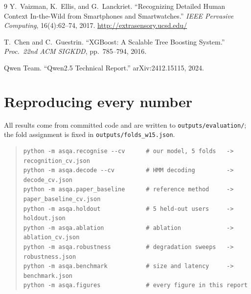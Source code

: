 \documentclass[11pt,a4paper]{article}
\newcommand{\code}[1]{\texttt{\small #1}}
\begin{document}
\begin{thebibliography}{9}
\small
{}
Y.~Vaizman, K.~Ellis, and G.~Lanckriet.
``Recognizing Detailed Human Context In-the-Wild from Smartphones and Smartwatches.''
\emph{IEEE Pervasive Computing}, 16(4):62--74, 2017.
\url{http://extrasensory.ucsd.edu/}

T.~Chen and C.~Guestrin.
``XGBoost: A Scalable Tree Boosting System.''
\emph{Proc.\ 22nd ACM SIGKDD}, pp.~785--794, 2016.

Qwen Team. ``Qwen2.5 Technical Report.'' arXiv:2412.15115, 2024.
\end{thebibliography}

\appendix
\section{Reproducing every number}

All results come from committed code and are written to \code{outputs/evaluation/}; the
fold assignment is fixed in \code{outputs/folds\_w15.json}.

\begin{quote}\small
\begin{verbatim}
python -m asqa.recognise --cv      # our model, 5 folds   -> recognition_cv.json
python -m asqa.decode --cv         # HMM decoding         -> decode_cv.json
python -m asqa.paper_baseline      # reference method     -> paper_baseline_cv.json
python -m asqa.holdout             # 5 held-out users     -> holdout.json
python -m asqa.ablation            # ablation             -> ablation_cv.json
python -m asqa.robustness          # degradation sweeps   -> robustness.json
python -m asqa.benchmark           # size and latency     -> benchmark.json
python -m asqa.figures             # every figure in this report
\end{verbatim}
\end{quote}
\end{document}
